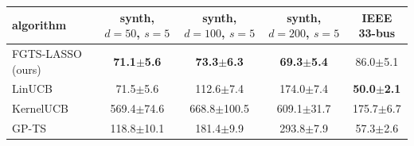 \begin{tabular}{lcccc}
\toprule
algorithm & synth, $d{=}50$, $s{=}5$ & synth, $d{=}100$, $s{=}5$ & synth, $d{=}200$, $s{=}5$ & IEEE 33-bus \\
\midrule
FGTS-LASSO (ours) & \textbf{71.1$\pm$5.6} & \textbf{73.3$\pm$6.3} & \textbf{69.3$\pm$5.4} & 86.0$\pm$5.1 \\
LinUCB & 71.5$\pm$5.6 & 112.6$\pm$7.4 & 174.0$\pm$7.4 & \textbf{50.0$\pm$2.1} \\
KernelUCB & 569.4$\pm$74.6 & 668.8$\pm$100.5 & 609.1$\pm$31.7 & 175.7$\pm$6.7 \\
GP-TS & 118.8$\pm$10.1 & 181.4$\pm$9.9 & 293.8$\pm$7.9 & 57.3$\pm$2.6 \\
\bottomrule
\end{tabular}